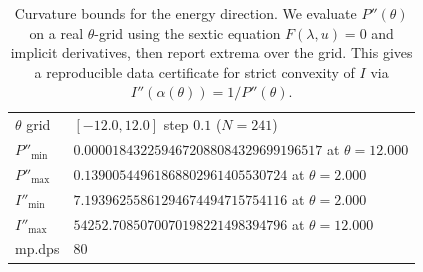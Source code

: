 \begin{table}[H]
\centering
\scriptsize
\setlength{\tabcolsep}{6pt}
\caption{Curvature bounds for the energy direction. We evaluate $P''(\theta)$ on a real $\theta$-grid using the sextic equation $F(\lambda,u)=0$ and implicit derivatives, then report extrema over the grid. This gives a reproducible data certificate for strict convexity of $I$ via $I''(\alpha(\theta))=1/P''(\theta)$.}
\label{tab:sync_kernel_rate_curve_curvature_bounds}
\begin{tabular}{l l}
\toprule
$\theta$ grid & $[-12.0,12.0]$ step $0.1$ ($N=241$)\\
$P''_{\min}$ & $0.0000184322594672088084329699196517$ at $\theta=12.000$\\
$P''_{\max}$ & $0.13900544961868802961405530724$ at $\theta=2.000$\\
$I''_{\min}$ & $7.19396255861294674494715754116$ at $\theta=2.000$\\
$I''_{\max}$ & $54252.7085070070198221498394796$ at $\theta=12.000$\\
mp.dps & $80$\\
\bottomrule
\end{tabular}
\end{table}

